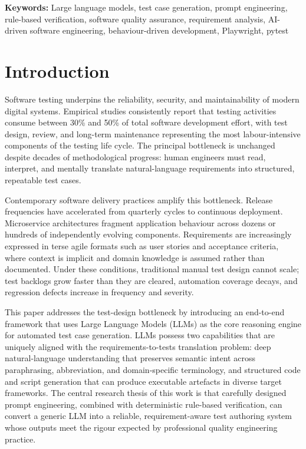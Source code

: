 \documentclass[11pt,letterpaper]{article}
\begin{document}
\begin{abstract}
and API test artefacts into the existing framework-generator pipeline. Threats to validity, prompt and data governance, and a reproducibility artefact are discussed. The paper and the deployed service therefore report on the same framework configuration, exercised on the same 312-requirement dataset with the same prompt templates and verification rules, and differ only in packaging.
\end{abstract}

\noindent\textbf{Keywords:} Large language models, test case generation, prompt engineering, rule-based verification, software quality assurance, requirement analysis, AI-driven software engineering, behaviour-driven development, Playwright, pytest\vspace{6pt}

\section{Introduction}

Software testing underpins the reliability, security, and maintainability of modern digital systems. Empirical studies consistently report that testing activities consume between 30\% and 50\% of total software development effort, with test design, review, and long-term maintenance representing the most labour-intensive components of the testing life cycle. The principal bottleneck is unchanged despite decades of methodological progress: human engineers must read, interpret, and mentally translate natural-language requirements into structured, repeatable test cases.

Contemporary software delivery practices amplify this bottleneck. Release frequencies have accelerated from quarterly cycles to continuous deployment. Microservice architectures fragment application behaviour across dozens or hundreds of independently evolving components. Requirements are increasingly expressed in terse agile formats such as user stories and acceptance criteria, where context is implicit and domain knowledge is assumed rather than documented. Under these conditions, traditional manual test design cannot scale; test backlogs grow faster than they are cleared, automation coverage decays, and regression defects increase in frequency and severity.

This paper addresses the test-design bottleneck by introducing an end-to-end framework that uses Large Language Models (LLMs) as the core reasoning engine for automated test case generation. LLMs possess two capabilities that are uniquely aligned with the requirements-to-tests translation problem: deep natural-language understanding that preserves semantic intent across paraphrasing, abbreviation, and domain-specific terminology, and structured code and script generation that can produce executable artefacts in diverse target frameworks. The central research thesis of this work is that carefully designed prompt engineering, combined with deterministic rule-based verification, can convert a generic LLM into a reliable, requirement-aware test authoring system whose outputs meet the rigour expected by professional quality engineering practice.
\end{document}
